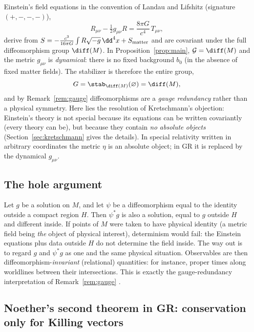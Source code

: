 Einstein's field equations in the convention of Landau and Lifshitz
(signature $(+,-,-,-)$),
\begin{equation}\label{eq:einstein}
  R_{\mu\nu}-\tfrac12 g_{\mu\nu}R=\frac{8\pi G}{c^4}\,T_{\mu\nu},
\end{equation}
derive from $S=-\tfrac{c^3}{16\pi G}\int R\sqrt{-g}\,\dd^4x+S_{\rm matter}$
and are covariant under the full diffeomorphism group $\diff(M)$. In
Proposition~\ref{prop:main}, $\mathcal G=\diff(M)$ and the metric $g_{\mu\nu}$
is \emph{dynamical}: there is no fixed background $b_0$ (in the absence of
fixed matter fields). The stabilizer is therefore the entire group,
\begin{equation}
  G=\stab_{\diff(M)}(\varnothing)=\diff(M),
\end{equation}
and by Remark~\ref{rem:gauge} diffeomorphisms are a \emph{gauge redundancy}
rather than a physical symmetry. Here lies the resolution of Kretschmann's
objection: Einstein's theory is not special because its equations can be
written covariantly (every theory can be), but because they contain
\emph{no absolute objects} \cite{anderson} (Section~\ref{sec:kretschmann} gives
the details). In special relativity written in arbitrary coordinates the metric $\eta$ is an absolute object; in GR it is
replaced by the dynamical $g_{\mu\nu}$.

\subsection{The hole argument}

Let $g$ be a solution on $M$, and let $\psi$ be a diffeomorphism equal to the
identity outside a compact region $H$. Then $\psi^*g$ is also a solution,
equal to $g$ outside $H$ and different inside. If points of $M$ were taken to
have physical identity (a metric field being \emph{the} object of physical
interest), determinism would fail: the Einstein equations plus data outside $H$
do not determine the field inside. The way out is to regard $g$ and $\psi^*g$
as one and the same physical situation. Observables are then
diffeomorphism-\emph{invariant} (relational) quantities: for instance,
proper times along worldlines between their intersections. This is exactly
the gauge-redundancy interpretation of Remark~\ref{rem:gauge}
\cite{earman,norton}.

\subsection{Noether's second theorem in GR: conservation only for Killing vectors}

